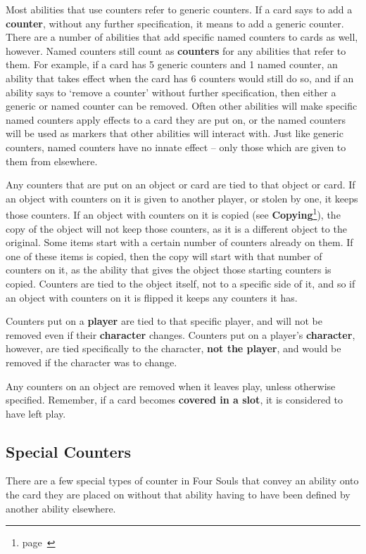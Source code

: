 \documentclass[
  fontsize=10pt,
  paper=a5,
  version=last,
  chapterprefix=true,
  bindingoffset=5mm,
  ]{scrbook}
\begin{document}
    Most abilities that use counters refer to generic counters. If a card says to add a \textbf{counter}, without any further specification, it means to add a generic counter. There are a number of abilities that add specific named counters to cards as well, however. Named counters still count as \textbf{counters} for any abilities that refer to them. For example, if a card has 5 generic counters and 1 named counter, an ability that takes effect when the card has 6 counters would still do so, and if an ability says to ‘remove a counter’ without further specification, then either a generic or named counter can be removed. Often other abilities will make specific named counters apply effects to a card they are put on, or the named counters will be used as markers that other abilities will interact with. Just like generic counters, named counters have no innate effect – only those which are given to them from elsewhere.

    Any counters that are put on an object or card are tied to that object or card. If an object with counters on it is given to another player, or stolen by one, it keeps those counters. If an object with counters on it is copied (see \textbf{Copying}\footnote{page~\pageref{copying}}), the copy of the object will not keep those counters, as it is a different object to the original. Some items start with a certain number of counters already on them. If one of these items is copied, then the copy will start with that number of counters on it, as the ability that gives the object those starting counters is copied. Counters are tied to the object itself, not to a specific side of it, and so if an object with counters on it is flipped it keeps any counters it has.

    Counters put on a \textbf{player} are tied to that specific player, and will not be removed even if their \textbf{character} changes. Counters put on a player’s \textbf{character}, however, are tied specifically to the character, \textbf{not the player}, and would be removed if the character was to change.

    Any counters on an object are removed when it leaves play, unless otherwise specified. Remember, if a card becomes \textbf{covered in a slot}, it is considered to have left play.
    \subsection*{Special Counters}
    There are a few special types of counter in Four Souls that convey an ability onto the card they are placed on without that ability having to have been defined by another ability elsewhere.
\end{document}
